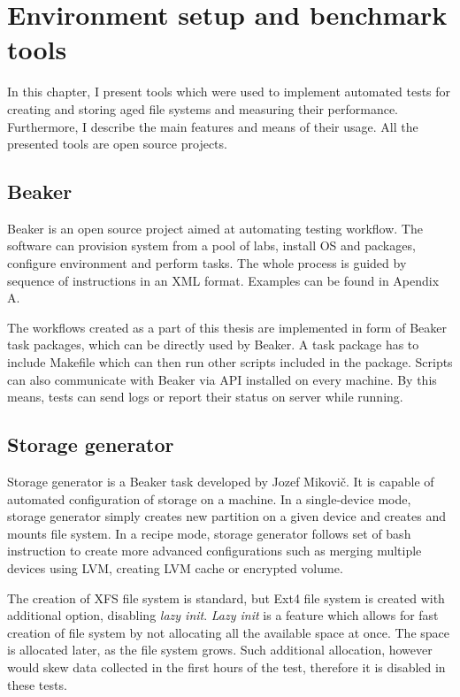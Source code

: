 \documentclass[
  color, %
  table, %
  lof,   %
  lot,   %
]{fithesis3}
\begin{document}
\chapter{Environment setup and benchmark tools}
In this chapter, I present tools which were used to implement automated tests for creating and storing aged file systems and measuring their performance. Furthermore, I describe the main features and means of their usage. All the presented tools are open source projects.

\section{Beaker}
Beaker is an open source project aimed at automating testing workflow. The software can provision system from a pool of labs, install OS and packages, configure environment and perform tasks. The whole process is guided by sequence of instructions in an XML format. Examples can be found in Apendix A.

The workflows created as a part of this thesis are implemented in form of Beaker task packages, which can be directly used by Beaker. A task package has to include Makefile which can then run other scripts included in the package. Scripts can also communicate with Beaker via API installed on every machine.  By this means, tests can send logs or report their status on server while running.

\section{Storage generator}
Storage generator is a Beaker task developed by Jozef Mikovič. It is capable of automated configuration of storage on a machine. In a single-device mode, storage generator simply creates new partition on a given device and creates and mounts file system. In a recipe mode, storage generator follows set of bash instruction to create more advanced configurations such as merging multiple devices using LVM, creating LVM cache or encrypted volume.

The creation of XFS file system is standard, but Ext4 file system is created with additional option, disabling \textit{lazy init}. \textit{Lazy init} is a feature which allows for fast creation of file system by not allocating all the available space at once. The space is allocated later, as the file system grows. Such additional allocation, however would skew data collected in the first hours of the test, therefore it is disabled in these tests.
\end{document}
